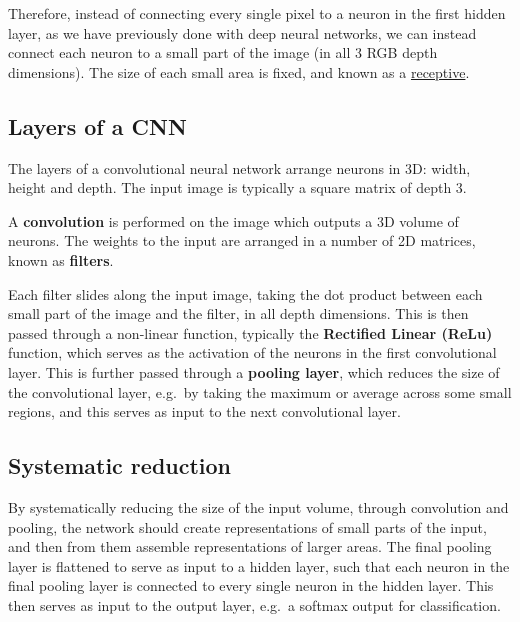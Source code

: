 \documentclass[%
oneside,                 %
final,                   %
10pt]{article}
\begin{document}
Therefore, instead of connecting every single pixel to a neuron in the
first hidden layer, as we have previously done with deep neural
networks, we can instead connect each neuron to a small part of the
image (in all 3 RGB depth dimensions).  The size of each small area is
fixed, and known as a \href{{https://en.wikipedia.org/wiki/Receptive_field}}{receptive}.


\subsection{Layers of a CNN}

The layers of a convolutional neural network arrange neurons in 3D: width, height and depth.  
The input image is typically a square matrix of depth 3. 

A \textbf{convolution} is performed on the image which outputs
a 3D volume of neurons. The weights to the input are arranged in a number of 2D matrices, known as \textbf{filters}.

Each filter slides along the input image, taking the dot product
between each small part of the image and the filter, in all depth
dimensions. This is then passed through a non-linear function,
typically the \textbf{Rectified Linear (ReLu)} function, which serves as the
activation of the neurons in the first convolutional layer. This is
further passed through a \textbf{pooling layer}, which reduces the size of the
convolutional layer, e.g.~by taking the maximum or average across some
small regions, and this serves as input to the next convolutional
layer.

\subsection{Systematic reduction}

By systematically reducing the size of the input volume, through
convolution and pooling, the network should create representations of
small parts of the input, and then from them assemble representations
of larger areas.  The final pooling layer is flattened to serve as
input to a hidden layer, such that each neuron in the final pooling
layer is connected to every single neuron in the hidden layer. This
then serves as input to the output layer, e.g.~a softmax output for
classification.


\end{document}
